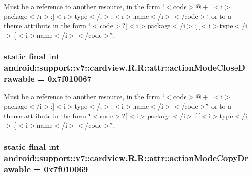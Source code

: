 Must be a reference to another resource, in the form \char`\"{}$<$code$>$@\mbox{[}+\mbox{]}\mbox{[}$<$i$>$package$<$/i$>$:\mbox{]}$<$i$>$type$<$/i$>$:$<$i$>$name$<$/i$>$$<$/code$>$\char`\"{} or to a theme attribute in the form \char`\"{}$<$code$>$?\mbox{[}$<$i$>$package$<$/i$>$:\mbox{]}\mbox{[}$<$i$>$type$<$/i$>$:\mbox{]}$<$i$>$name$<$/i$>$$<$/code$>$\char`\"{}. \hypertarget{classandroid_1_1support_1_1v7_1_1cardview_1_1_r_1_1attr_3b07efcc32cd02474ade588fab22e5e5}{
\subsubsection[{actionModeCloseDrawable}]{\setlength{\rightskip}{0pt plus 5cm}static final int android::support::v7::cardview.R.R::attr::actionModeCloseDrawable = 0x7f010067}}
\label{classandroid_1_1support_1_1v7_1_1cardview_1_1_r_1_1attr_3b07efcc32cd02474ade588fab22e5e5}


Must be a reference to another resource, in the form \char`\"{}$<$code$>$@\mbox{[}+\mbox{]}\mbox{[}$<$i$>$package$<$/i$>$:\mbox{]}$<$i$>$type$<$/i$>$:$<$i$>$name$<$/i$>$$<$/code$>$\char`\"{} or to a theme attribute in the form \char`\"{}$<$code$>$?\mbox{[}$<$i$>$package$<$/i$>$:\mbox{]}\mbox{[}$<$i$>$type$<$/i$>$:\mbox{]}$<$i$>$name$<$/i$>$$<$/code$>$\char`\"{}. \hypertarget{classandroid_1_1support_1_1v7_1_1cardview_1_1_r_1_1attr_2855129c1fb982c8f9c24026c9c03c6a}{
\subsubsection[{actionModeCopyDrawable}]{\setlength{\rightskip}{0pt plus 5cm}static final int android::support::v7::cardview.R.R::attr::actionModeCopyDrawable = 0x7f010069}}
\label{classandroid_1_1support_1_1v7_1_1cardview_1_1_r_1_1attr_2855129c1fb982c8f9c24026c9c03c6a}


